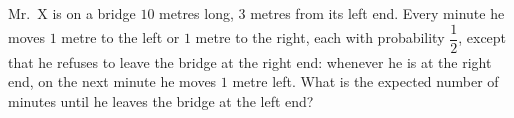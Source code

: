 Mr.~X is on a bridge $10$ metres long, $3$ metres from its left end. Every minute he moves $1$ metre to the left or $1$ metre to the right, each with probability $\dfrac12$, except that he refuses to leave the bridge at the right end: whenever he is at the right end, on the next minute he moves $1$ metre left. What is the expected number of minutes until he leaves the bridge at the left end?
